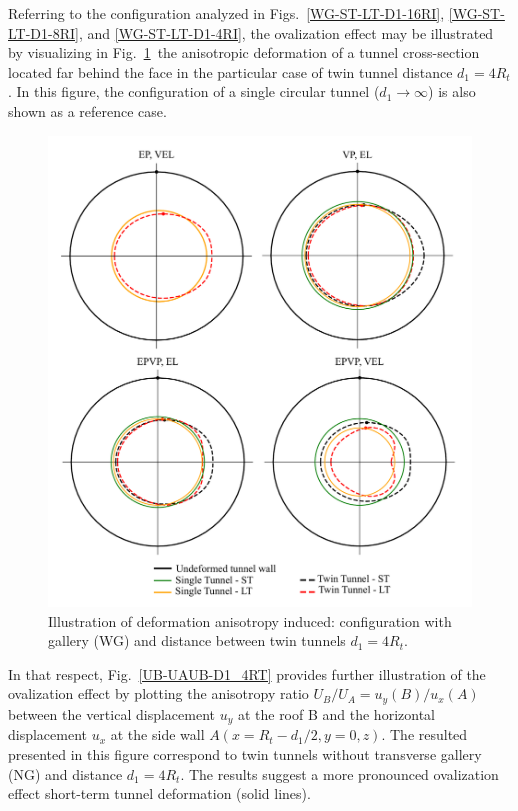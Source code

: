 \documentclass[Journal,letterpaper, NoLists,SectionNumbers]{ascelike-new}
\begin{document}
Referring to the configuration analyzed in Figs.~\ref{WG-ST-LT-D1-16RI}, \ref{WG-ST-LT-D1-8RI}, and \ref{WG-ST-LT-D1-4RI}, the ovalization effect may be illustrated by visualizing in Fig.~\ref{ovalization}~the anisotropic deformation of  a tunnel cross-section located far behind the face  in the particular case of twin tunnel distance $d_1=4R_t$. In this figure, the configuration of a single circular tunnel ($d_1 \rightarrow \infty$) is also shown as a reference case. 

\begin{figure}[h!]
	\centering
	\includegraphics[scale=0.4]{ovalization.pdf}
	\caption{Illustration of deformation anisotropy induced: configuration with gallery (WG) and distance between twin tunnels $d_1 = 4R_t$.}
	\label{ovalization}
\end{figure}

In that respect, Fig.~\ref{UB-UAUB-D1_4RT} provides further illustration of the ovalization effect by plotting the anisotropy ratio $U_B/U_A = u_y(B)/u_x(A)$ between the vertical displacement $u_y$ at the roof B and the horizontal displacement $u_x$ at the side wall $A(x=R_t - d_1/2,y=0,z)$. The resulted presented in this figure correspond to twin tunnels without transverse gallery (NG) and distance $d_1=4R_t$. The results suggest a more pronounced ovalization effect short-term tunnel deformation (solid lines).
\end{document}
